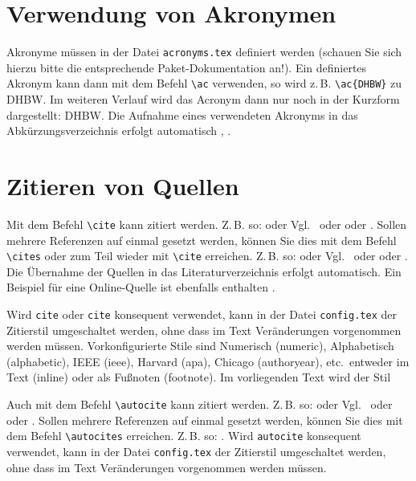\section{Verwendung von Akronymen}
Akronyme müssen in der Datei \texttt{acronyms.tex} definiert werden (schauen Sie sich hierzu bitte die entsprechende 
Paket-Dokumentation an!). Ein definiertes Akronym kann dann mit dem Befehl \texttt{\textbackslash ac} verwenden, so wird 
z.\,B. \texttt{\textbackslash ac\{DHBW\}} zu \ac{DHBW}. Im weiteren Verlauf wird das Acronym dann nur noch in der Kurzform 
dargestellt: \ac{DHBW}. Die Aufnahme eines verwendeten Akronyms in das Abkürzungsverzeichnis erfolgt automatisch 
\autocite[Vgl.][S. 77ff]{TestOnlineQuelle}, \autocite[Vgl.][S. 42]{ME12}. 

\section{Zitieren von Quellen}
Mit dem Befehl \texttt{\textbackslash cite} kann zitiert werden. Z.\,B. so: \cite[Vgl.][S.~18ff]{ME12} oder Vgl.~\cite[S.~18ff]{ME12} 
oder \cite[S.~18ff]{ME12} oder \cite{ME12}. Sollen mehrere Referenzen auf einmal gesetzt werden, können Sie dies mit dem 
Befehl \texttt{\textbackslash cites} oder zum Teil wieder mit 
\texttt{\textbackslash cite} erreichen. Z.\,B. so: \cites[Vgl.][S. 10]{ME12}[Vgl.][S. 100]{TD15}  
oder Vgl.~\cite{ME12, TD15} oder oder \cite{ME12, TD15}. Die Übernahme der Quellen in das Literaturverzeichnis erfolgt automatisch. 
Ein Beispiel für eine Online-Quelle ist ebenfalls enthalten \cite{TestOnlineQuelle}.

Wird \texttt{cite} oder \texttt{cite} konsequent verwendet, kann in der Datei \texttt{config.tex} der Zitierstil umgeschaltet 
werden, ohne dass im Text Veränderungen vorgenommen werden müssen. Vorkonfigurierte Stile sind Numerisch (numeric), 
Alphabetisch (alphabetic), IEEE (ieee), Harvard (apa), Chicago (authoryear), etc.~entweder im Text (inline) oder als Fußnoten 
(footnote). Im vorliegenden Text wird der Stil %

Auch mit dem Befehl \texttt{\textbackslash autocite} kann zitiert werden. Z.\,B. so: \autocite[Vgl.][S.~18ff]{ME12}
oder Vgl.~\autocite[S.~18ff]{ME12} oder \autocite[S.~18ff]{ME12} oder \autocite{ME12}{.} Sollen mehrere Referenzen auf einmal 
gesetzt werden, können Sie dies mit dem Befehl \texttt{\textbackslash autocites} erreichen. Z.\,B. so:
\autocites[Vgl.][S. 10]{ME12}[][S. 100]{TD15}. Wird \texttt{autocite} konsequent verwendet, kann in der Datei 
\texttt{config.tex} der Zitierstil umgeschaltet werden, ohne dass im Text Veränderungen vorgenommen werden müssen. 

